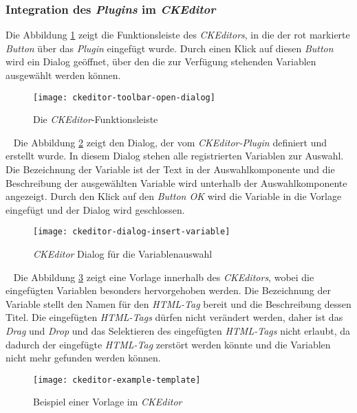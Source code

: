 \subsubsection{Integration des \emph{Plugins} im \emph{CKEditor}}
Die Abbildung \ref{fig:ckeditor-toolbar-opne-dialog} zeigt die Funktionsleiste des \emph{CKEditors}, in die der rot markierte \emph{Button} über das \emph{Plugin} eingefügt wurde. Durch einen Klick auf diesen \emph{Button} wird ein Dialog geöffnet, über den die zur Verfügung stehenden Variablen ausgewählt werden können.
\begin{figure}[h]
\centering
\texttt{[image: ckeditor-toolbar-open-dialog]}
\caption{Die \emph{CKEditor}-Funktionsleiste}
\label{fig:ckeditor-toolbar-opne-dialog}
\end{figure}
\ \newline
Die Abbildung \ref{fig:ckeditor-dialog-insert-variable} zeigt den Dialog, der vom \emph{CKEditor-Plugin} definiert und erstellt wurde. In diesem Dialog stehen alle registrierten Variablen zur Auswahl. Die Bezeichnung der Variable ist der Text in der Auswahlkomponente und die Beschreibung der ausgewählten Variable wird unterhalb der Auswahlkomponente angezeigt. Durch den Klick auf den \emph{Button OK} wird die Variable in die Vorlage eingefügt und der Dialog wird geschlossen.
\begin{figure}[h]
\centering
\texttt{[image: ckeditor-dialog-insert-variable]}
\caption{\emph{CKEditor} Dialog für die Variablenauswahl}
\label{fig:ckeditor-dialog-insert-variable}
\end{figure}
\ \newline
Die Abbildung \ref{fig:ckeditor-example-template} zeigt eine Vorlage innerhalb des \emph{CKEditors}, wobei die eingefügten Variablen besonders hervorgehoben werden. Die Bezeichnung  der Variable stellt den Namen für den \emph{HTML-Tag} bereit und die Beschreibung dessen Titel. Die eingefügten \emph{HTML-Tags} dürfen nicht verändert werden, daher ist das \emph{Drag} und \emph{Drop} und das Selektieren des eingefügten \emph{HTML-Tags} nicht erlaubt, da dadurch der eingefügte \emph{HTML-Tag} zerstört werden könnte und die Variablen nicht mehr gefunden werden können.
\begin{figure}[h]
\centering
\texttt{[image: ckeditor-example-template]}
\caption{Beispiel einer Vorlage im \emph{CKEditor}}
\label{fig:ckeditor-example-template}
\end{figure}

